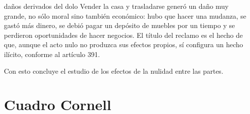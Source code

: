 \documentclass[12pt,oneside]{book}
\begin{document}
\begin{example}{daños derivados del dolo}
Vender la casa y trasladarse generó un daño muy grande, no sólo moral sino también económico: hubo que hacer una mudanza, se gastó más dinero, se debió pagar un depósito de muebles por un tiempo y se perdieron oportunidades de hacer negocios. El título del reclamo es el hecho de que, aunque el acto nulo no produzca sus efectos propios, sí configura un hecho ilícito, conforme al artículo 391.
\end{example}

Con esto concluye el estudio de los efectos de la nulidad entre las partes.

\clearpage
\section{Cuadro Cornell}
\end{document}
